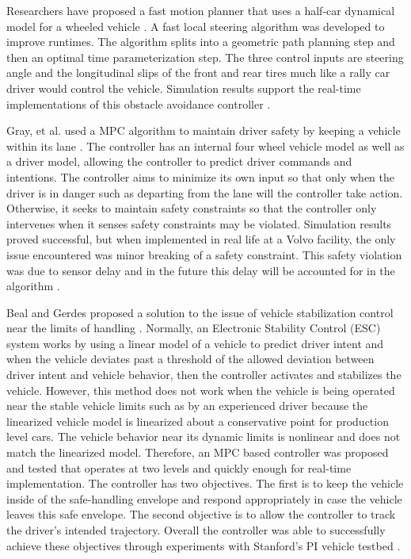 \documentclass[12pt,onecolumn]{report}
\begin{document}
Researchers have proposed a fast motion planner that uses a half-car dynamical model for a wheeled vehicle \cite{Jeon&Cowlagi2013}. A fast local steering algorithm was developed to improve runtimes. The algorithm splits into a geometric path planning step and then an optimal time parameterization step. The three control inputs are steering angle and the longitudinal slips of the front and rear tires much like a rally car driver would control the vehicle. Simulation results support the real-time implementations of this obstacle avoidance controller \cite{Jeon&Cowlagi2013}.

Gray, et al. used a MPC algorithm to maintain driver safety by keeping a vehicle within its lane \cite{Ali&Gray2013}. The controller has an internal four wheel vehicle model as well as a driver model, allowing the controller to predict driver commands and intentions. The controller aims to minimize its own input so that only when the driver is in danger such as departing from the lane will the controller take action. Otherwise, it seeks to maintain safety constraints so that the controller only intervenes when it senses safety constraints may be violated. Simulation results proved successful, but when implemented in real life at a Volvo facility, the only issue encountered was minor breaking of a safety constraint. This safety violation was due to sensor delay and in the future this delay will be accounted for in the algorithm \cite{Ali&Gray2013}.

Beal and Gerdes proposed a solution to the issue of vehicle stabilization control near the limits of handling \cite{Beal&Gerdes2013}. Normally, an Electronic Stability Control (ESC) system works by using a linear model of a vehicle to predict driver intent and when the vehicle deviates past a threshold of the allowed deviation between driver intent and vehicle behavior, then the controller activates and stabilizes the vehicle. However, this method does not work when the vehicle is being operated near the stable vehicle limits such as by an experienced driver because the linearized vehicle model is linearized about a conservative point for production level cars. The vehicle behavior near its dynamic limits is nonlinear and does not match the linearized model. Therefore, an MPC based controller was proposed and tested that operates at two levels and quickly enough for real-time implementation. The controller has two objectives. The first is to keep the vehicle inside of the safe-handling envelope and respond appropriately in case the vehicle leaves this safe envelope. The second objective is to allow the controller to track the driver's intended trajectory. Overall the controller was able to successfully achieve these objectives through experiments with Stanford's PI vehicle testbed \cite{Beal&Gerdes2013}.
\end{document}

